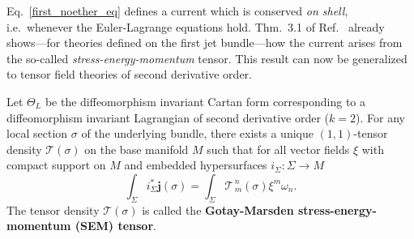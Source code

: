 Eq.~\ref{first_noether_eq} defines a current which is conserved \emph{on shell}, i.e.~whenever the Euler-Lagrange equations hold. Thm.~3.1 of Ref.~\cite{goma} already shows---for theories defined on the first jet bundle---how the current arises from the so-called \emph{stress-energy-momentum} tensor. This result can now be generalized to tensor field theories of second derivative order.
\begin{theorem}\label{sem_thm}
  Let $\Theta_L$ be the diffeomorphism invariant Cartan form corresponding to a diffeomorphism invariant Lagrangian of second derivative order ($k=2$). For any local section $\sigma$ of the underlying bundle, there exists a unique $(1,1)$-tensor density $\mathcal T(\sigma)$ on the base manifold $M$ such that for all vector fields $\xi$ with compact support on $M$ and embedded hypersurfaces $i_\Sigma \colon \Sigma \rightarrow M$
  \begin{equation}\label{sem_definition}
    \int_\Sigma i_\Sigma^\ast\boldsymbol{j}(\sigma) = \int_\Sigma \mathcal T^{\,n}_{\,m}(\sigma)\xi^m \omega_n.
  \end{equation}
  The tensor density $\mathcal T(\sigma)$ is called the \textbf{Gotay-Marsden stress-energy-momentum (SEM) tensor}.
\end{theorem}
